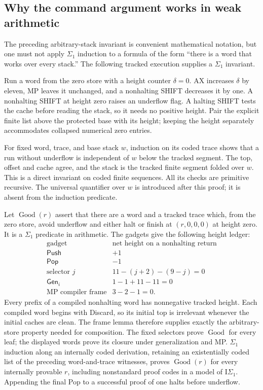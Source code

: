 \subsection{Why the command argument works in weak arithmetic}

The preceding arbitrary-stack invariant is convenient mathematical
notation, but one must not apply $\Sigma_1$ induction to a formula of
the form ``there is a word that works over every stack.''  The following
tracked execution supplies a $\Sigma_1$ invariant.

Run a word from the zero store with a height counter $\delta=0$.
AX increases $\delta$ by eleven, MP leaves it unchanged, and a
nonhalting SHIFT decreases it by one.  A nonhalting SHIFT at height
zero raises an underflow flag.  A halting SHIFT tests the cache before
reading the stack, so it needs no positive height.  Pair the explicit
finite list above the protected base with its height; keeping the
height separately accommodates collapsed numerical zero entries.

For fixed word, trace, and base stack $w$, induction on its coded trace
shows that a run without underflow is independent of $w$ below the
tracked segment.  The top, offset and cache agree, and the stack is
the tracked finite segment folded over $w$.  This is a direct invariant
on coded finite sequences.  All its checks are primitive recursive.
The universal quantifier over $w$ is introduced after this proof;
it is absent from the induction predicate.

Let $\operatorname{Good}(r)$ assert that there are a word and a tracked
trace which, from the zero store, avoid underflow and either halt or
finish at $(r,0,0,0)$ at height zero.  It is a $\Sigma_1$ predicate in
arithmetic.  The gadgets give the following height ledger:
\[
\begin{array}{l|c}
\text{gadget}&\text{net height on a nonhalting return}\\\hline
\mathsf{Push}&+1\\
\mathsf{Pop}&-1\\
\text{selector }j&11-(j+2)-(9-j)=0\\
\mathsf{Gen}_i&1-1+11-11=0\\
\text{MP compiler frame}&3-2-1=0.
\end{array}
\]
Every prefix of a compiled nonhalting word has nonnegative tracked
height.  Each compiled word begins with Discard, so its initial top
is irrelevant whenever the initial caches are clean.  The frame lemma
therefore supplies exactly the arbitrary-store property needed for
composition.  The fixed selectors prove $\operatorname{Good}$ for
every leaf; the displayed words prove its closure under generalization
and MP.  $\Sigma_1$ induction along an internally coded derivation, retaining
an existentially coded list of the preceding word-and-trace witnesses,
proves $\operatorname{Good}(r)$ for every internally provable $r$,
including nonstandard proof codes in a model of $\mathrm I\Sigma_1$.
Appending the final Pop to a successful proof of one halts before
underflow.

